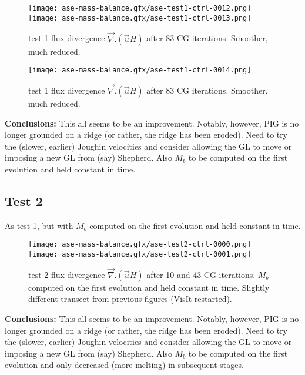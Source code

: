 \documentclass{article}
\begin{document}
\begin{figure}
\begin{center}
\texttt{[image: ase-mass-balance.gfx/ase-test1-ctrl-0012.png]}
\texttt{[image: ase-mass-balance.gfx/ase-test1-ctrl-0013.png]}
\end{center}
\caption{\protect{\label{fig::test1c}}} test 1 flux divergence $\vec{\nabla}. (\vec{u} H)$
after 83 CG iterations. Smoother, much reduced.
\end{figure}


\begin{figure}
\begin{center}
\texttt{[image: ase-mass-balance.gfx/ase-test1-ctrl-0014.png]}
\end{center}
\caption{\protect{\label{fig::test1c}}} test 1  flux divergence $\vec{\nabla}. (\vec{u} H)$
after 83 CG iterations. Smoother, much reduced.
\end{figure}

{\large {\bf Conclusions:}} This all seems to be an improvement. Notably, however, PIG is no longer grounded on a ridge
(or rather, the ridge has been eroded). Need to try the (slower, earlier) Joughin velocities and consider allowing the
GL to move or imposing a new GL from (say) Shepherd. Also $M_b$ to be computed on the first evolution and held constant in time.

\subsection{Test 2}

As test 1, but with $M_b$ computed on the first evolution and held constant in time.

\begin{figure}
\begin{center}
\texttt{[image: ase-mass-balance.gfx/ase-test2-ctrl-0000.png]}
\texttt{[image: ase-mass-balance.gfx/ase-test2-ctrl-0001.png]}
\end{center}
\caption{\protect{\label{fig::test1b}}} test 2 flux divergence $\vec{\nabla}. (\vec{u} H)$
after 10 and 43 CG iterations. $M_b$ computed on the first evolution and held constant in time.
Slightly different transect from previous figures (VisIt restarted).
\end{figure}


{\large {\bf Conclusions:}} This all seems to be an improvement. Notably, however, PIG is no longer grounded on a ridge
(or rather, the ridge has been eroded). Need to try the (slower, earlier) Joughin velocities and consider allowing the
GL to move or imposing a new GL from (say) Shepherd. Also $M_b$ to be computed on the first evolution and only decreased 
(more melting) in subsequent stages. 
\end{document}
